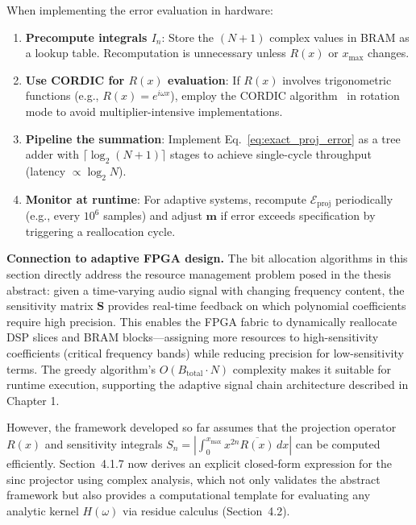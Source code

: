 When implementing the error evaluation in hardware:
\begin{enumerate}
\item \textbf{Precompute integrals $I_n$}: Store the $(N+1)$ complex values in BRAM as a lookup table. Recomputation is unnecessary unless $R(x)$ or $x_{\max}$ changes.

\item \textbf{Use CORDIC for $R(x)$ evaluation}: If $R(x)$ involves trigonometric functions (e.g., $R(x) = e^{i\omega x}$), employ the CORDIC algorithm~\cite{Andraka1998,Volder1959} in rotation mode to avoid multiplier-intensive implementations.

\item \textbf{Pipeline the summation}: Implement Eq.~\eqref{eq:exact_proj_error} as a tree adder with $\lceil \log_2(N+1) \rceil$ stages to achieve single-cycle throughput (latency $\propto \log_2 N$).

\item \textbf{Monitor at runtime}: For adaptive systems, recompute $\mathcal{E}_{\text{proj}}$ periodically (e.g., every $10^6$ samples) and adjust $\mathbf{m}$ if error exceeds specification by triggering a reallocation cycle.
\end{enumerate}

\bigskip
\noindent\textbf{Connection to adaptive FPGA design.} The bit allocation algorithms in this section directly address the resource management problem posed in the thesis abstract: given a time-varying audio signal with changing frequency content, the sensitivity matrix $\mathbf{S}$ provides real-time feedback on which polynomial coefficients require high precision. This enables the FPGA fabric to dynamically reallocate DSP slices and BRAM blocks—assigning more resources to high-sensitivity coefficients (critical frequency bands) while reducing precision for low-sensitivity terms. The greedy algorithm's $O(B_{\text{total}} \cdot N)$ complexity makes it suitable for runtime execution, supporting the adaptive signal chain architecture described in Chapter 1.

However, the framework developed so far assumes that the projection operator $R(x)$ and sensitivity integrals $S_n = \left|\int_0^{x_{\max}} x^{2n} \overline{R(x)} \, dx\right|$ can be computed efficiently. Section~4.1.7 now derives an explicit closed-form expression for the sinc projector using complex analysis, which not only validates the abstract framework but also provides a computational template for evaluating any analytic kernel $H(\omega)$ via residue calculus (Section~4.2).


